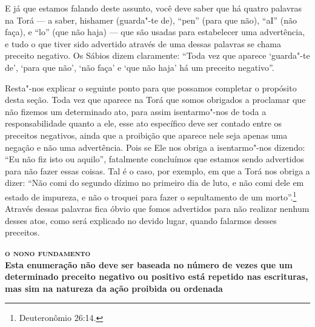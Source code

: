 E já que estamos falando deste assunto, você deve saber que há quatro
palavras na Torá\starr{} --- a saber, hishamer\starr{} (guarda"-te de), ``pen''
(para que não), ``aI'' (não faça), e ``lo'' (que não haja) --- que são
usadas para estabelecer uma advertência, e tudo o que tiver sido
advertido através de uma dessas palavras se chama preceito negativo. Os
Sábios dizem claramente: ``Toda vez que aparece `guarda"-te de', `para
que não', `não faça' e `que não haja' há um preceito negativo''.

Resta"-nos explicar o seguinte ponto para que possamos completar o
propósito desta seção. Toda vez que aparece na Torá\starr{} que somos obrigados
a proclamar que não fizemos um determinado ato, para assim isentarmo"-nos
de toda a responsabilidade quanto a ele, esse ato específico deve ser
contado entre os preceitos negativos, ainda que a proibição que aparece
nele seja apenas uma negação e não uma advertência. Pois se Ele nos
obriga a isentarmo"-nos dizendo: ``Eu não fiz isto ou aquilo'',
fatalmente concluímos que estamos sendo advertidos para não fazer essas
coisas. Tal é o caso, por exemplo, em que a Torá\starr{} nos obriga a dizer:
``Não comi do segundo dízimo no primeiro dia de luto, e não comi dele em
estado de impureza, e não o troquei para fazer o sepultamento de um
morto''.\footnote{Deuteronômio 26:14.} Através dessas palavras fica óbvio que
fomos advertidos para não realizar nenhum desses atos, como será
explicado no devido lugar, quando falarmos desses preceitos.


\bigskip

\noindent\textbf{\textsc{o nono fundamento}\\Esta enumeração não deve ser baseada no número de vezes que um determinado preceito negativo ou positivo está repetido nas escrituras, mas sim na natureza da ação proibida ou ordenada}

\smallskip


